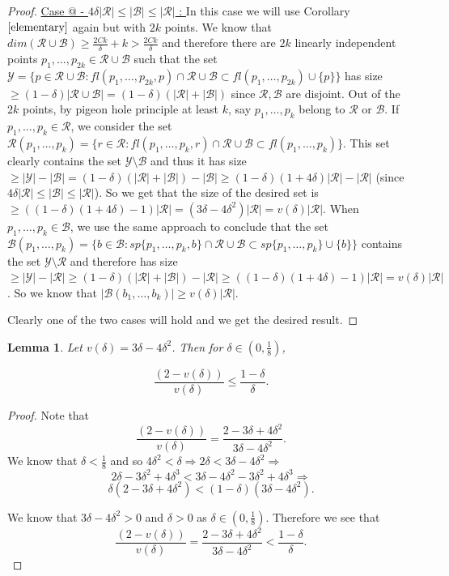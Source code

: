 \documentclass[12pt]{caltech_thesis}
\makeatletter
\theoremstyle{plain}
\newtheorem{lemma}{Lemma}
\theoremstyle{definition}
\newcommand{\MB}{\mathcal{B}}
\newcommand{\MR}{\mathcal{R}}
\newcommand{\MY}{\mathcal{Y}}
\newcommand*{\rom}[1]{\expandafter\@slowromancap\romannumeral #1@}
\makeatother
\begin{document}
\begin{proof}
 \underline{Case \rom{2} - $4\delta|\MR|\leq |\MB|\leq |\MR|$ : } 
In this case we will use Corollary $\ref{elementary}$ again but with $2k$ points. We know that $dim(\MR\cup\MB) \geq \frac{2Ck}{\delta}+k
>\frac{2Ck}{\delta}$ and therefore there are $2k$ linearly independent points $p_1,\ldots,p_{2k} \in \MR\cup \MB$ such that the set 
$\MY =  \{p\in \MR\cup \MB : fl(p_1,\ldots,p_{2k},p)\cap \MR\cup \MB \subset fl(p_1,\ldots,p_{2k})\cup \{p\}\}$ has size 
$\geq (1-\delta)|\MR\cup \MB| = (1-\delta)(|\MR| + |\MB|)$ since $\MR,\MB$ are disjoint. Out of the $2k$ points, by pigeon hole principle
at least $k$, say $p_1,\ldots,p_k$ belong to $\MR$ or $\MB$. If $p_1,\ldots,p_k \in \MR$, we consider the set 
$ \MR(p_1,\ldots,p_k) = \{r\in \MR : fl(p_1,\ldots,p_k,r)\cap \MR\cup\MB \subset fl(p_1,\ldots,p_k) \}$. This set clearly contains the set 
$\MY\setminus \MB$
and thus it has size $\geq |\MY|-|\MB| = (1-\delta)(|\MR|+|\MB|) - |\MB| \geq (1-\delta)(1+4\delta)|\MR| - |\MR|$ 
(since $4\delta|\MR|\leq |\MB|\leq |\MR|$). So we get that the size of the desired set is  $\geq((1-\delta)(1+4\delta)-1)|\MR|
 = (3\delta - 4\delta^2)|\MR| = v(\delta)|\MR|$.
When $p_1,\ldots,p_k \in \MB$, we use the same approach to conclude that the set 
$\MB(p_1,\ldots,p_k) = \{b\in \MB : sp\{p_1,\ldots,p_k,b\}\cap \MR\cup \MB \subset sp\{p_1,\ldots,p_k\}\cup \{b\}\} $
contains the set $ \MY\setminus \MR$ and therefore has size $\geq |\MY|-|\MR| \geq (1-\delta)(|\MR|+|\MB|)-|\MR|
\geq ((1-\delta)(1+4\delta)-1)|\MR| = v(\delta)|\MR|$. 
So we know that $|\MB(b_1,\ldots,b_k)| \geq  v(\delta)|\MR|$.
 
 
Clearly one of the two cases will hold and we get the desired result.
 
 \end{proof} 
 
 
 
 
 \begin{lemma}\label{lemma:calculationproof}
Let $v(\delta) = 3\delta - 4\delta^2$. Then for $\delta\in (0, \frac{1}{8})$,

\[
  \frac{(2-v(\delta))}{v(\delta)}\leq \frac{1-\delta}{\delta}.
\]

\end{lemma}

\begin{proof}
Note that
\[
 \frac{(2-v(\delta))}{v(\delta)} = \frac{2-3\delta + 4\delta^2}{3\delta -4\delta^2}.
\]
We know that $\delta <\frac{1}{8}$ and so $4\delta^2 < \delta \Rightarrow 2\delta < 3\delta -4\delta^2 \Rightarrow$
\[
   2\delta - 3\delta^2 + 4\delta^3 < 3\delta -4\delta^2 -3\delta^2 + 4\delta^3 \Rightarrow
\]
\[
 \delta (2-3\delta + 4\delta^2) < (1-\delta) (3\delta - 4\delta^2). 
\]

We know that $3\delta - 4\delta^2 > 0$ and $\delta >0$ as $\delta \in (0,\frac{1}{8})$. Therefore we see that
\[
 \frac{(2-v(\delta))}{v(\delta)} = \frac{2-3\delta + 4\delta^2}{3\delta - 4\delta^2} <\frac{1-\delta}{\delta}.
\]



 
\end{proof}
\end{document}
